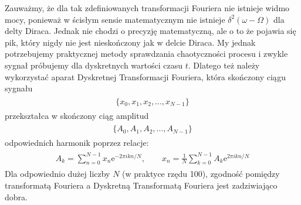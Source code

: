 \documentclass[a4paper,12pt,polish]{sphinxmanual}
\begin{document}
Zauważmy, że dla tak zdefiniowanych  transformacji Fouriera nie istnieje widmo mocy, ponieważ w ścisłym sensie matematycznym nie istnieje $\delta^2(\omega -\Omega)$ dla delty Diraca. Jednak nie chodzi o precyzję matematyczną, ale o to że pojawia się pik, który nigdy nie jest nieskończony jak w delcie Diraca. My jednak potrzebujemy praktycznej metody sprawdzania chaotyczności procesu i zwykle sygnał próbujemy dla dyskretnych wartości czasu $t$. Dlatego też należy wykorzystać aparat Dyskretnej Transformacji Fouriera, która  skończony ciągu sygnału
\label{ch2/chII012:equation-eqn25}\begin{gather}
\begin{split}\{x_0, x_1, x_2, ..., x_{N-1}\}\end{split}\label{ch2/chII012-eqn25}
\end{gather}
przekształca w skończony ciąg amplitud
\label{ch2/chII012:equation-eqn26}\begin{gather}
\begin{split}\{A_0, A_1, A_2, ..., A_{N-1}\}\end{split}\label{ch2/chII012-eqn26}
\end{gather}
odpowiednich harmonik poprzez relacje:
\label{ch2/chII012:equation-eqn27}\begin{gather}
\begin{split}A_k = \sum_{n=0}^{N-1}  x_n  \mbox{e}^{- 2\pi i k n/N}, \qquad x_n = \frac{1}{N}  \sum_{k=0}^{N-1}  A_k  \mbox{e}^{2\pi i k n/N}\end{split}\label{ch2/chII012-eqn27}
\end{gather}
Dla odpowiednio dużej liczby $N$ (w praktyce rzędu 100), zgodność pomiędzy transformatą Fouriera a Dyskretną Transformatą Fouriera jest zadziwiająco dobra.
\end{document}
